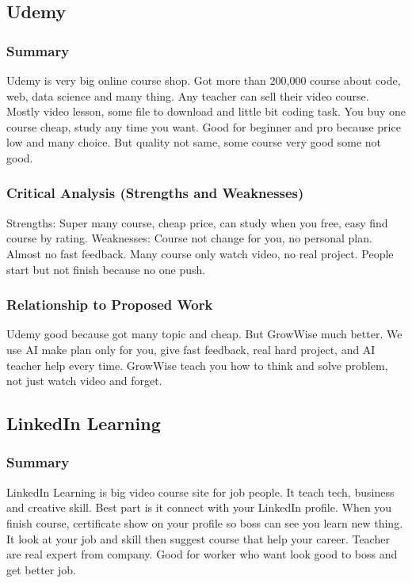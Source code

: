 \documentclass{FastFyp}
\begin{document}
\subsection{Udemy}

\subsubsection{Summary}
Udemy \cite{ref:Udemy} is very big online course shop. Got more than 200,000 course about code, web, data science and many thing. Any teacher can sell their video course. Mostly video lesson, some file to download and little bit coding task. You buy one course cheap, study any time you want. Good for beginner and pro because price low and many choice. But quality not same, some course very good some not good.

\subsubsection{Critical Analysis (Strengths and Weaknesses)}
Strengths: Super many course, cheap price, can study when you free, easy find course by rating.  
Weaknesses: Course not change for you, no personal plan. Almost no fast feedback. Many course only watch video, no real project. People start but not finish because no one push.

\subsubsection{Relationship to Proposed Work}
Udemy good because got many topic and cheap. But GrowWise much better. We use AI make plan only for you, give fast feedback, real hard project, and AI teacher help every time. GrowWise teach you how to think and solve problem, not just watch video and forget.

\subsection{LinkedIn Learning}

\subsubsection{Summary}
LinkedIn Learning \cite{ref:LinkedInLearning} is big video course site for job people. It teach tech, business and creative skill. Best part is it connect with your LinkedIn profile. When you finish course, certificate show on your profile so boss can see you learn new thing. It look at your job and skill then suggest course that help your career. Teacher are real expert from company. Good for worker who want look good to boss and get better job.
\end{document}
